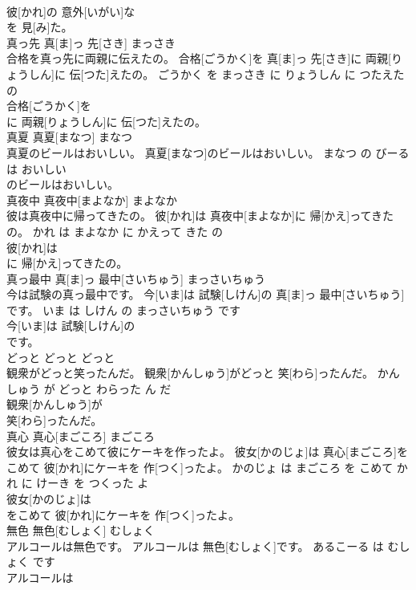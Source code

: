 \documentclass[8pt]{extreport}
\begin{document}
\begin{CJK}{UTF8}{min}
\\	彼[かれ]の 意外[いがい]な
\\	を 見[み]た。			
\\	真っ先	真[ま]っ 先[さき]	まっさき	
\\	合格を真っ先に両親に伝えたの。	合格[ごうかく]を 真[ま]っ 先[さき]に 両親[りょうしん]に 伝[つた]えたの。	ごうかく を まっさき に りょうしん に つたえた の	
\\	合格[ごうかく]を
\\	に 両親[りょうしん]に 伝[つた]えたの。			
\\	真夏	真夏[まなつ]	まなつ	
\\	真夏のビールはおいしい。	真夏[まなつ]のビールはおいしい。	まなつ の びーる は おいしい	
\\	のビールはおいしい。			
\\	真夜中	真夜中[まよなか]	まよなか	
\\	彼は真夜中に帰ってきたの。	彼[かれ]は 真夜中[まよなか]に 帰[かえ]ってきたの。	かれ は まよなか に かえって きた の	
\\	彼[かれ]は
\\	に 帰[かえ]ってきたの。			
\\	真っ最中	真[ま]っ 最中[さいちゅう]	まっさいちゅう	
\\	今は試験の真っ最中です。	今[いま]は 試験[しけん]の 真[ま]っ 最中[さいちゅう]です。	いま は しけん の まっさいちゅう です	
\\	今[いま]は 試験[しけん]の
\\	です。			
\\	どっと	どっと	どっと	
\\	観衆がどっと笑ったんだ。	観衆[かんしゅう]がどっと 笑[わら]ったんだ。	かんしゅう が どっと わらった ん だ	
\\	観衆[かんしゅう]が
\\	笑[わら]ったんだ。			
\\	真心	真心[まごころ]	まごころ	
\\	彼女は真心をこめて彼にケーキを作ったよ。	彼女[かのじょ]は 真心[まごころ]をこめて 彼[かれ]にケーキを 作[つく]ったよ。	かのじょ は まごころ を こめて かれ に けーき を つくった よ	
\\	彼女[かのじょ]は
\\	をこめて 彼[かれ]にケーキを 作[つく]ったよ。			
\\	無色	無色[むしょく]	むしょく	
\\	アルコールは無色です。	アルコールは 無色[むしょく]です。	あるこーる は むしょく です	
\\	アルコールは

\end{CJK}
\end{document}
